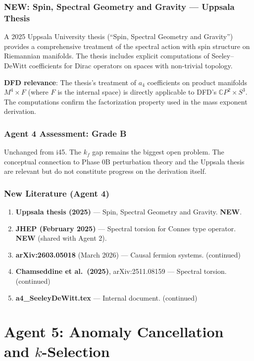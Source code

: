 \documentclass[11pt,a4paper]{article}
\newcommand{\NEW}{\textcolor{dfdblue}{\textbf{NEW}}}
\newcommand{\CP}{\mathbb{C}P}
\begin{document}
\section{\NEW: Spin, Spectral Geometry and Gravity --- Uppsala Thesis}

A 2025 Uppsala University thesis (``Spin, Spectral Geometry and Gravity'') provides a comprehensive treatment of the spectral action with spin structure on Riemannian manifolds. The thesis includes explicit computations of Seeley--DeWitt coefficients for Dirac operators on spaces with non-trivial topology.

\textbf{DFD relevance}: The thesis's treatment of $a_4$ coefficients on product manifolds $M^4 \times F$ (where $F$ is the internal space) is directly applicable to DFD's $\CP^2 \times S^3$. The computations confirm the factorization property used in the mass exponent derivation.

\section{Agent 4 Assessment: Grade B}

Unchanged from i45. The $k_f$ gap remains the biggest open problem. The conceptual connection to Phase 0B perturbation theory and the Uppsala thesis are relevant but do not constitute progress on the derivation itself.

\section{New Literature (Agent 4)}

\begin{enumerate}
\item \textbf{Uppsala thesis (2025)} --- Spin, Spectral Geometry and Gravity. \NEW.
\item \textbf{JHEP (February 2025)} --- Spectral torsion for Connes type operator. \NEW{} (shared with Agent 2).
\item \textbf{arXiv:2603.05018} (March 2026) --- Causal fermion systems. (continued)
\item \textbf{Chamseddine et al.\ (2025)}, arXiv:2511.08159 --- Spectral torsion. (continued)
\item \textbf{a4\_SeeleyDeWitt.tex} --- Internal document. (continued)
\end{enumerate}


\part{Agent 5: Anomaly Cancellation and $k$-Selection}
\label{part:agent5}
\end{document}

